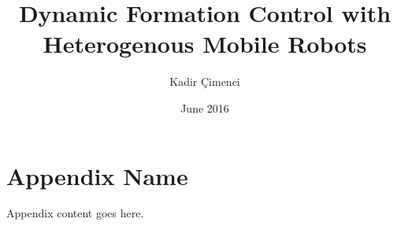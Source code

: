 \documentclass[chaparabic,ee,ms,12pt,oneandhalf]{metu}
\author{Kadir Çimenci}
\title{Dynamic Formation Control with Heterogenous Mobile Robots}
\date{June 2016}
\begin{document}
\begin{preliminaries}


\end{preliminaries}
%   
% 
%






  



	
%


\appendix
\chapter{Appendix Name}
Appendix content goes here.
 
%

\end{document}
